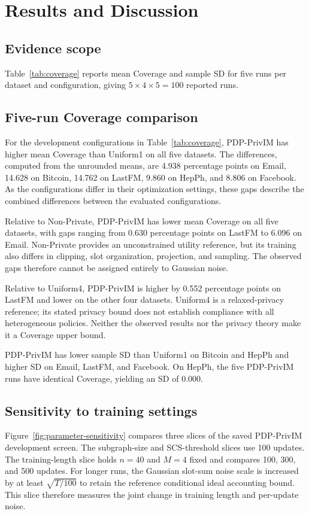 \chapter{Results and Discussion}\label{ch:results}
\section{Evidence scope}
Table~\ref{tab:coverage} reports mean Coverage and sample SD for five runs per dataset and configuration, giving $5\times4\times5=100$ reported runs.

\section{Five-run Coverage comparison}

For the development configurations in Table~\ref{tab:coverage}, PDP-PrivIM has higher mean Coverage than Uniform1 on all five datasets. The differences, computed from the unrounded means, are 4.938 percentage points on Email, 14.628 on Bitcoin, 14.762 on LastFM, 9.860 on HepPh, and 8.806 on Facebook. As the configurations differ in their optimization settings, these gaps describe the combined differences between the evaluated configurations.

Relative to Non-Private, PDP-PrivIM has lower mean Coverage on all five datasets, with gaps ranging from 0.630 percentage points on LastFM to 6.096 on Email. Non-Private provides an unconstrained utility reference, but its training also differs in clipping, slot organization, projection, and sampling. The observed gaps therefore cannot be assigned entirely to Gaussian noise.

Relative to Uniform4, PDP-PrivIM is higher by 0.552 percentage points on LastFM and lower on the other four datasets. Uniform4 is a relaxed-privacy reference; its stated privacy bound does not establish compliance with all heterogeneous policies. Neither the observed results nor the privacy theory make it a Coverage upper bound.

PDP-PrivIM has lower sample SD than Uniform1 on Bitcoin and HepPh and higher SD on Email, LastFM, and Facebook. On HepPh, the five PDP-PrivIM runs have identical Coverage, yielding an SD of 0.000.

\section{Sensitivity to training settings}
Figure~\ref{fig:parameter-sensitivity} compares three slices of the saved PDP-PrivIM development screen. The subgraph-size and SCS-threshold slices use 100 updates. The training-length slice holds $n=40$ and $M=4$ fixed and compares 100, 300, and 500 updates. For longer runs, the Gaussian slot-sum noise scale is increased by at least $\sqrt{T/100}$ to retain the reference conditional ideal accounting bound. This slice therefore measures the joint change in training length and per-update noise.

